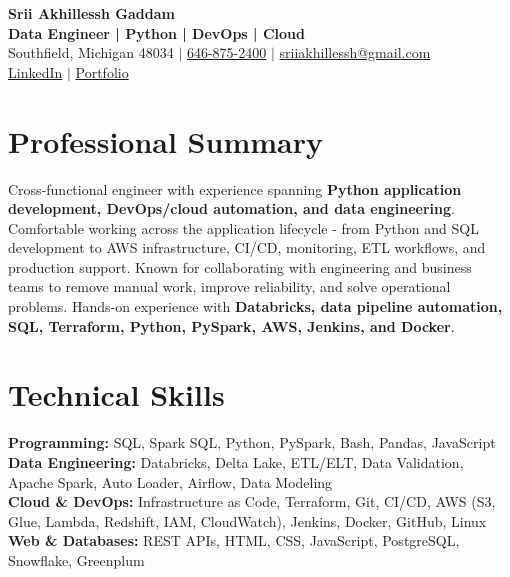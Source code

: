 \documentclass[letterpaper,10pt]{article}
\begin{document}
\fontsize{9.35pt}{10.45pt}\selectfont

\begin{center}
    {\LARGE \textbf{Srii Akhillessh Gaddam}} \\[-1pt]
    \textbf{Data Engineer | Python | DevOps | Cloud} \\[2pt]
    Southfield, Michigan 48034 $|$
    \href{tel:6468752400}{646-875-2400} $|$
    \href{mailto:sriiakhillessh@gmail.com}{sriiakhillessh@gmail.com} \\[1pt]
    \href{https://www.linkedin.com/in/srii-akhiilessh-gaddam-b48668191/}{LinkedIn} $|$
    \href{https://sriiakhillesshg.github.io/portfolio/}{Portfolio}
\end{center}
\vspace{-8pt}

\section{Professional Summary}
\small{Cross-functional engineer with experience spanning \textbf{Python application development, DevOps/cloud automation, and data engineering}. Comfortable working across the application lifecycle - from Python and SQL development to AWS infrastructure, CI/CD, monitoring, ETL workflows, and production support. Known for collaborating with engineering and business teams to remove manual work, improve reliability, and solve operational problems. Hands-on experience with \textbf{Databricks, data pipeline automation, SQL, Terraform, Python, PySpark, AWS, Jenkins, and Docker}.}

\section{Technical Skills}
\small{
\textbf{Programming:} SQL, Spark SQL, Python, PySpark, Bash, Pandas, JavaScript \\
\textbf{Data Engineering:} Databricks, Delta Lake, ETL/ELT, Data Validation, Apache Spark, Auto Loader, Airflow, Data Modeling \\
\textbf{Cloud \& DevOps:} Infrastructure as Code, Terraform, Git, CI/CD, AWS (S3, Glue, Lambda, Redshift, IAM, CloudWatch), Jenkins, Docker, GitHub, Linux \\
\textbf{Web \& Databases:} REST APIs, HTML, CSS, JavaScript, PostgreSQL, Snowflake, Greenplum
}
\end{document}

